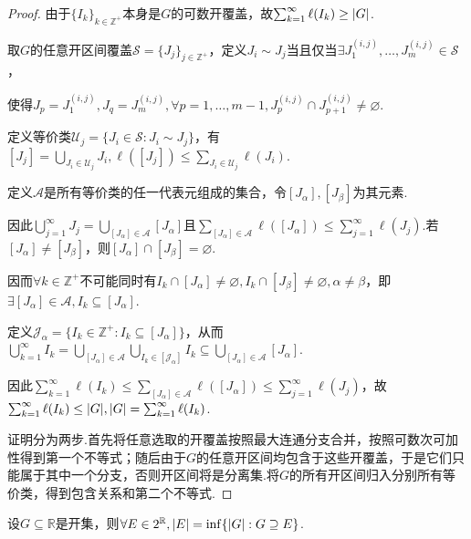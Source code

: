 \begin{proof}
    由于\(\{I_k\}_{k \in \mathbb{Z}^+}\)本身是\(G\)的可数开覆盖，故\(\sum_{k=1}^\infty \ell(I_k) \geq \abs*{G}\).

    取\(G\)的任意开区间覆盖\(\mathcal{S}=\{J_j\}_{j \in \mathbb{Z}^+}\)，定义\(J_i \sim J_j\)当且仅当\(\exists J_1^{(i,j)}, \dots, J_m^{(i,j)} \in \mathcal{S}\)，

    使得\(J_p=J_1^{(i,j)}, J_q=J_m^{(i,j)}, \forall p=1, \dots, m-1, J_p^{(i,j)} \cap J_{p+1}^{(i,j)} \ne \varnothing\).

    定义等价类\(\mathcal{U}_j=\{J_i \in \mathcal{S}: J_i \sim J_j\}\)，有\([J_j]=\bigcup_{J_i \in \mathcal{U}_j} J_i, \ell([J_j]) \leq \sum_{J_i \in \mathcal{U}_j} \ell(J_i)\).

    {\kaishu 定义\(\mathcal{A}\)是所有等价类的任一代表元组成的集合，令\([J_\alpha], [J_\beta]\)为其元素.}
    
    因此\(\bigcup_{j=1}^\infty J_j=\bigcup_{[J_\alpha] \in \mathcal{A}} [J_\alpha]\)且\(\sum_{[J_\alpha] \in \mathcal{A}} \ell([J_\alpha]) \leq \sum_{j=1}^\infty \ell(J_j)\).若\([J_\alpha] \ne [J_\beta]\)，则\([J_\alpha] \cap [J_\beta]=\varnothing\).
    
    因而\(\forall k \in \mathbb{Z}^+\)不可能同时有\(I_k \cap [J_\alpha] \ne \varnothing, I_k \cap [J_\beta] \ne \varnothing, \alpha \ne \beta\)，即\(\exists [J_\alpha] \in \mathcal{A}, I_k \subseteq [J_\alpha]\).

    定义\(\mathcal{J}_\alpha=\{I_k \in \mathbb{Z}^+: I_k \subseteq [J_\alpha]\}\)，从而\(\bigcup_{k=1}^\infty I_k=\bigcup_{[J_\alpha] \in \mathcal{A}} \bigcup_{I_k \in [\mathcal{J}_\alpha]} I_k \subseteq \bigcup_{[J_\alpha] \in \mathcal{A}} [J_\alpha]\).

    因此\(\sum_{k=1}^\infty \ell(I_k) \leq \sum_{[J_\alpha] \in \mathcal{A}} \ell([J_\alpha]) \leq \sum_{j=1}^\infty \ell(J_j)\)，故\(\sum_{k=1}^\infty \ell(I_k) \leq \abs*{G}, \abs*{G}=\sum_{k=1}^\infty \ell(I_k)\).

    {\kaishu 证明分为两步.首先将任意选取的开覆盖按照最大连通分支合并，按照可数次可加性得到第一个不等式；随后由于\(G\)的任意开区间均包含于这些开覆盖，于是它们只能属于其中一个分支，否则开区间将是分离集.将\(G\)的所有开区间归入分别所有等价类，得到包含关系和第二个不等式.}
\end{proof}

\begin{lemma}\label{2.A.11.1}
    设\(G \subseteq \mathbb{R}\)是开集，则\(\forall E \in 2^\mathbb{R}, \abs*{E}=\inf\{\abs*{G}: G \supseteq E\}\).
\end{lemma}

